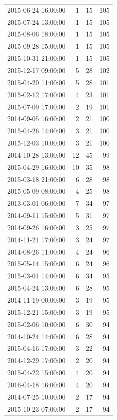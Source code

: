 \begin{tabular}{lrrr}
2015-06-24 16:00:00 & 1 & 15 & 105 \\
2015-07-24 13:00:00 & 1 & 15 & 105 \\
2015-08-06 18:00:00 & 1 & 15 & 105 \\
2015-09-28 15:00:00 & 1 & 15 & 105 \\
2015-10-31 21:00:00 & 1 & 15 & 105 \\
2015-12-17 09:00:00 & 5 & 28 & 102 \\
2015-04-20 11:00:00 & 5 & 28 & 101 \\
2015-02-12 17:00:00 & 4 & 23 & 101 \\
2015-07-09 17:00:00 & 2 & 19 & 101 \\
2014-09-05 16:00:00 & 2 & 21 & 100 \\
2015-04-26 14:00:00 & 3 & 21 & 100 \\
2015-12-03 10:00:00 & 3 & 21 & 100 \\
2014-10-28 13:00:00 & 12 & 45 & 99 \\
2015-04-29 16:00:00 & 10 & 35 & 98 \\
2015-03-18 21:00:00 & 6 & 28 & 98 \\
2015-05-09 08:00:00 & 4 & 25 & 98 \\
2013-03-01 06:00:00 & 7 & 34 & 97 \\
2014-09-11 15:00:00 & 5 & 31 & 97 \\
2014-09-26 16:00:00 & 3 & 25 & 97 \\
2014-11-21 17:00:00 & 3 & 24 & 97 \\
2014-08-26 11:00:00 & 4 & 24 & 96 \\
2015-05-14 15:00:00 & 6 & 24 & 96 \\
2015-03-01 14:00:00 & 6 & 34 & 95 \\
2015-04-24 13:00:00 & 6 & 28 & 95 \\
2014-11-19 00:00:00 & 3 & 19 & 95 \\
2015-12-21 15:00:00 & 3 & 19 & 95 \\
2015-02-06 10:00:00 & 6 & 30 & 94 \\
2014-10-24 14:00:00 & 6 & 28 & 94 \\
2015-04-16 17:00:00 & 3 & 22 & 94 \\
2014-12-29 17:00:00 & 2 & 20 & 94 \\
2015-04-22 15:00:00 & 4 & 20 & 94 \\
2016-04-18 16:00:00 & 4 & 20 & 94 \\
2014-07-25 10:00:00 & 2 & 17 & 94 \\
2015-10-23 07:00:00 & 2 & 17 & 94 \\

\end{tabular}
